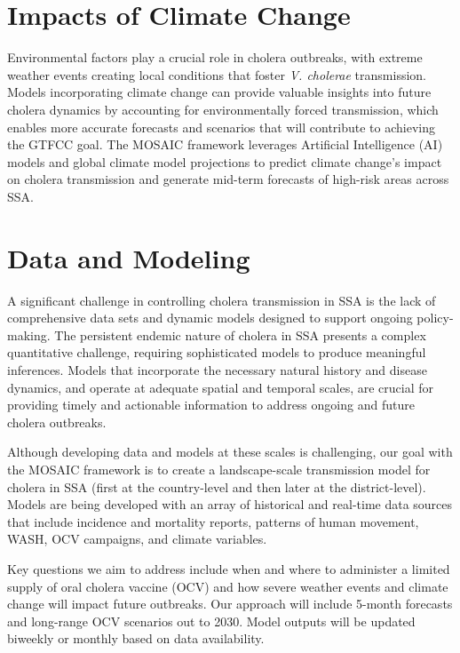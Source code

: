 \documentclass[
]{book}
\begin{document}
\section{Impacts of Climate Change}\label{impacts-of-climate-change}

Environmental factors play a crucial role in cholera outbreaks, with extreme weather events creating local conditions that foster \emph{V. cholerae} transmission. Models incorporating climate change can provide valuable insights into future cholera dynamics by accounting for environmentally forced transmission, which enables more accurate forecasts and scenarios that will contribute to achieving the GTFCC goal. The MOSAIC framework leverages Artificial Intelligence (AI) models and global climate model projections to predict climate change's impact on cholera transmission and generate mid-term forecasts of high-risk areas across SSA.

\section{Data and Modeling}\label{data-and-modeling}

A significant challenge in controlling cholera transmission in SSA is the lack of comprehensive data sets and dynamic models designed to support ongoing policy-making. The persistent endemic nature of cholera in SSA presents a complex quantitative challenge, requiring sophisticated models to produce meaningful inferences. Models that incorporate the necessary natural history and disease dynamics, and operate at adequate spatial and temporal scales, are crucial for providing timely and actionable information to address ongoing and future cholera outbreaks.

Although developing data and models at these scales is challenging, our goal with the MOSAIC framework is to create a landscape-scale transmission model for cholera in SSA (first at the country-level and then later at the district-level). Models are being developed with an array of historical and real-time data sources that include incidence and mortality reports, patterns of human movement, WASH, OCV campaigns, and climate variables.

Key questions we aim to address include when and where to administer a limited supply of oral cholera vaccine (OCV) and how severe weather events and climate change will impact future outbreaks. Our approach will include 5-month forecasts and long-range OCV scenarios out to 2030. Model outputs will be updated biweekly or monthly based on data availability.
\end{document}
